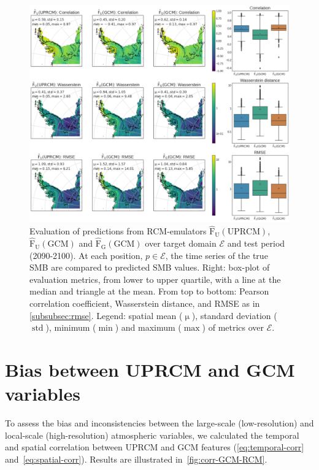 \documentclass[a4paper,11pt,oneside]{report}
\begin{document}
\begin{figure}[!ht]
  \centering
  \includegraphics[width=\columnwidth]{doc/Thesis-latex/images/results/metrics_RCM_GCM.pdf}
  \caption []{\small Evaluation of predictions from RCM-emulators $\mathrm{\hat{F}_{U}(UPRCM)}$,  $\mathrm{\hat{F}_{U}(GCM)}$ and $\mathrm{\hat{F}_{G}(GCM)}$ over target domain $\mathcal{E}$ and test period (2090-2100). At each position, $p \in\mathcal{E}$, the time series of the true SMB are compared to predicted SMB values. Right: box-plot of evaluation metrics, from lower to upper quartile, with a line at the median and triangle at the mean. From top to bottom: Pearson correlation coefficient, Wasserstein distance, and RMSE as in \autoref{subsubsec:rmse}. Legend: spatial mean ($\operatorname{\mu}$), standard deviation ($\operatorname{std}$), minimum ($\min$) and maximum ($\max$) of metrics over $\mathcal{E}$.}
  \vspace{-3mm}
  \label{fig:evaluation-GCM-RCM}
\end{figure}

\section{Bias between UPRCM and GCM variables}\label{sec:res-bias-RCM-GCM}
To assess the bias and inconsistencies between the large-scale (low-resolution) and local-scale (high-resolution) atmospheric variables, we calculated the temporal and spatial correlation between UPRCM and GCM features (\autoref{eq:temporal-corr} and~\ref{eq:spatial-corr}). Results are illustrated in~\autoref{fig:corr-GCM-RCM}. 
\end{document}
